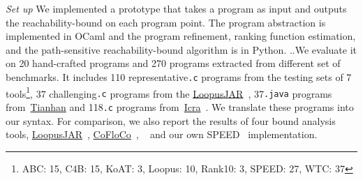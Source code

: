 \emph{Set up} We implemented a prototype {\THESYSTEM} that takes a program as input 
and outputs the reachability-bound on each program point.
The 
program abstraction is implemented in OCaml and the program refinement, ranking function estimation, and the path-sensitive reachability-bound algorithm is in Python.
..We evaluate it on 20 hand-crafted programs and 270 programs extracted from different set of benchmarks. 
It includes 110 representative{\tt .c} programs from the testing sets of 7 tools\footnote{ABC: 15, C4B: 15, KoAT: 3, Loopus: 10, Rank10: 3, SPEED: 27, WTC: 37}, 37 challenging{\tt .c} programs 
from the \hyperlink{https://forsyte.at/static/people/sinn/loopusJAR/index.html}{LoopusJAR}~\cite{BenchmarkLoops,SinnZV17},
37{\tt .java} programs from~\hyperlink{https://zenodo.org/record/5140586\#.Y5pBoC-B1QI}{Tianhan}\cite{BenchmarkTianhan,LuCT21}
and 118{\tt .c} programs from~\hyperlink{https://github.com/icra-team/icra}{Icra}~\cite{BenchmarkIcra,KincaidBCR19,CyphertBKR19}.
We translate these programs into our syntax.
For comparison, we also report the results of four bound analysis tools, 
\hyperlink{https://forsyte.at/software/loopus/}{LoopusJAR}~\cite{SinnZV17},
\hyperlink{https://github.com/aeflores/CoFloCo/tree/master/src}{CoFloCo}~\cite{ToolCofloco,Montoya17,Flores-Montoya16,Flores-MontoyaH14},
~\cite{BenchmarkTianhan}
and our own SPEED~\cite{GulwaniJK09} implementation.

